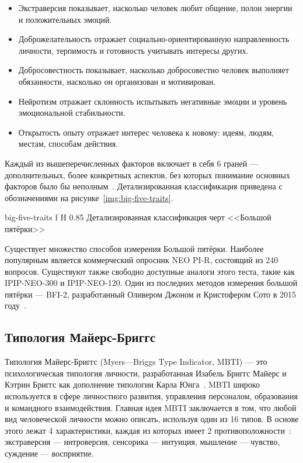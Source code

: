 \begin{itemize}
	\item Экстраверсия показывает, насколько человек любит общение, полон энергии и положительных эмоций.
	\item Доброжелательность отражает социально-ориентированную направленность личности, терпимость и готовность учитывать интересы других.
	\item Добросовестность показывает, насколько добросовестно человек выполняет обязанности, насколько он организован и мотивирован.
	\item Нейротизм отражает склонность испытывать негативные эмоции и уровень эмоциональной стабильности.
	\item Открытость опыту отражает интерес человека к новому: идеям, людям, местам, способам действия.
\end{itemize}

Каждый из вышеперечисленных факторов включает в себя 6 граней --- дополнительных, более конкретных аспектов, без которых понимание основных факторов было бы неполным~\cite{big_five_traits}.
Детализированная классификация приведена с обозначениями на рисунке~\ref{img:big-five-traits}.

{big-five-traits}
{f}
{H}
{0.85\textwidth}
{Детализированная классификация черт <<Большой пятёрки>>}

Существует множество способов измерения Большой пятёрки.
Наиболее популярным является коммерческий опросник NEO PI-R, состоящий из 240 вопросов.
Существуют также свободно доступные аналоги этого теста, такие как IPIP-NEO-300 и IPIP-NEO-120.
Один из последних методов измерения большой пятёрки --- BFI-2, разработанный Оливером Джоном и Кристофером Сото в 2015 году~\cite{big_five_inventory}.

\subsection{Типология Майерс-Бриггс}

Типология Майерс-Бриггс (Myers---Briggs Type Indicator, MBTI) --- это психологическая типология личности, разработанная Изабель Бриггс Майерс и Кэтрин Бриггс как дополнение типологии Карла Юнга~\cite{hjellegger-zigler}.
MBTI широко используется в сфере личностного развития, управления персоналом, образования и командного взаимодействия.
Главная идея MBTI заключается в том, что любой вид человеческой личности можно описать, используя один из 16 типов.
В основе этого лежат 4 характеристики, каждая из которых имеет 2 противоположности~\cite{Pittenger1993MeasuringMBTI}: экстраверсия --- интроверсия, сенсорика --- интуиция, мышление --- чувство, суждение --- восприятие.

